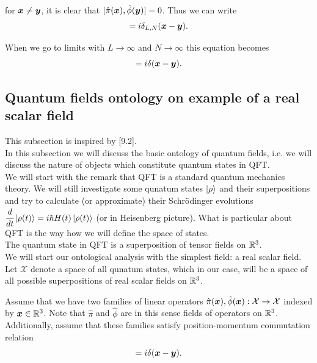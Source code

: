 \documentclass[main.tex]{subfiles}
\begin{document}
for $\boldsymbol{x}\not=\boldsymbol{y}$, it is clear that $[\hat{\pi}(\boldsymbol{x}), \hat{\phi}(\boldsymbol{y})] = 0$.
Thus we can write
\begin{equation}
[\hat{\phi}(\bs{x}), \hat{\pi}(\bs{y})] = i \delta_{L,N}(\bs{x} - \bs{y}).
\end{equation}

When we go to limits with $L\to\infty$ and $N\to\infty$ this equation becomes
\begin{equation}
[\hat{\phi}(\bs{x}), \hat{\pi}(\bs{y})] = i \delta(\bs{x} - \bs{y}).
\end{equation} 

\subsection{Quantum fields ontology on example of a real scalar field}
This subsection is inspired by \cite{peskin1995}[9.2].\\

In this subsection we will discuss the basic ontology of quantum fields, i.e. we will discuss the nature of objects which constitute quantum states in QFT.\\

We will start with the remark that QFT is a standard quantum mechanics theory. We will still investigate some qunatum states $\ket{\rho}$ and their superpositions and try to calculate (or approximate) their Schrödinger evolutions $\cfrac{d}{dt} \ket{\rho(t)} = i\hbar H(t)\ket{\rho(t)}$ (or in Heisenberg picture). What is particular about QFT is the way how we will define the space of states.\\

The quantum state in QFT is a superposition of tensor fields on $\mathbb{R}^3$.\\

We will start our ontological analysis with the simplest field: a real scalar field.
Let $\mathcal{X}$ denote a space of all qunatum states, which in our case, will be a space of all possible superpositions of real scalar fields on $\mathbb{R}^3$.

Assume that we have two families of linear operators $\hat{\pi}(\boldsymbol{x}), \hat{\phi}(\boldsymbol{x}): \mathcal{X}\to \mathcal{X}$ indexed by $\boldsymbol{x}\in\mathbb{R}^3$. Note that $\hat{\pi}$ and $\hat{\phi}$ are in this sense fields of operators on $\mathbb{R}^3$. Additionally, assume that these families satisfy position-momentum commutation relation
\begin{equation}
[\hat{\phi}(\bs{x}), \hat{\pi}(\bs{y})] = i\delta(\bs{x} - \bs{y}). 
\end{equation}
\end{document}
